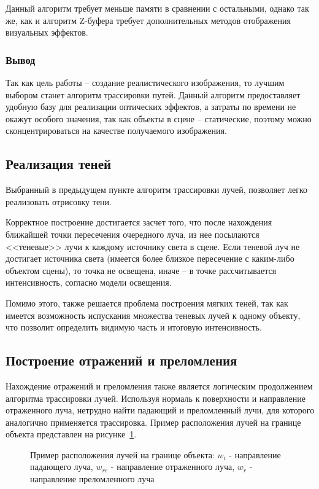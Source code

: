 Данный алгоритм требует меньше памяти в сравнении с остальными,
однако так же, как и алгоритм Z-буфера требует дополнительных методов
отображения визуальных эффектов.

\subsubsection*{Вывод}
Так как цель работы -- создание реалистического изображения, то лучшим
выбором станет алгоритм трассировки путей. Данный алгоритм предоставляет
удобную базу для реализации оптических эффектов, а затраты по времени не окажут
особого значения, так как объекты в сцене -- статические, поэтому можно
сконцентрироваться на качестве получаемого изображения.

\subsection{Реализация теней}
Выбранный в предыдущем пункте алгоритм трассировки лучей, позволяет
легко реализовать отрисовку тени.

Корректное построение достигается засчет того, что после нахождения
ближайшей точки пересечения очередного луча, из нее посылаются <<теневые>> лучи
к каждому источнику света в сцене. Если теневой луч не достигает источника света
(имеется более близкое пересечение с каким-либо объектом сцены), то точка не
освещена, иначе -- в точке рассчитывается интенсивность, согласно модели
освещения.

Помимо этого, также решается проблема построения мягких теней, так как
имеется возможность испускания множества теневых лучей к одному объекту, что
позволит определить видимую часть и итоговую интенсивность.

\subsection{Построение отражений и преломления}
Нахождение отражений и преломления также является логическим
продолжением алгоритма трассировки лучей. Используя нормаль к поверхности и
направление отраженного луча, нетрудно найти падающий и преломленный лучи,
для которого аналогично применяется трассировка. Пример расположения лучей
на границе объекта представлен на рисунке~\ref{fig:edge_ray}.

\begin{figure}[h]
    \centering
    \def\svgwidth{0.6\textwidth}
    
    \caption{Пример расположения лучей на границе объекта: $w_i$ - направление
             падающего луча, $w_{re}$ - направление отраженного луча,
             $w_r$ - направление преломленного луча}
    \label{fig:edge_ray}
\end{figure}

